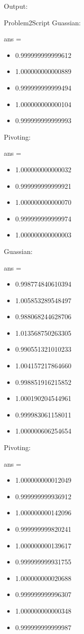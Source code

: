 \documentclass[]{article}
\providecommand{\tightlist}{%
  \setlength{\itemsep}{0pt}\setlength{\parskip}{0pt}}
\begin{document}
Output:

Problem2Script Guassian:

ans =

\begin{itemize}
\tightlist
\item
  0.999999999999612
\item
  1.000000000000889
\item
  0.999999999999494
\item
  1.000000000000104
\item
  0.999999999999993
\end{itemize}

Pivoting:

ans =

\begin{itemize}
\tightlist
\item
  1.000000000000032
\item
  0.999999999999921
\item
  1.000000000000070
\item
  0.999999999999974
\item
  1.000000000000003
\end{itemize}

Guassian:

ans =

\begin{itemize}
\tightlist
\item
  0.998774840610394
\item
  1.005853289548497
\item
  0.988068244628706
\item
  1.013568750263305
\item
  0.990551321010233
\item
  1.004157217864660
\item
  0.998851916215852
\item
  1.000190204544961
\item
  0.999983061158011
\item
  1.000000606254654
\end{itemize}

Pivoting:

ans =

\begin{itemize}
\tightlist
\item
  1.000000000012049
\item
  0.999999999936912
\item
  1.000000000142096
\item
  0.999999999820241
\item
  1.000000000139617
\item
  0.999999999931755
\item
  1.000000000020688
\item
  0.999999999996307
\item
  1.000000000000348
\item
  0.999999999999987
\end{itemize}
\end{document}
